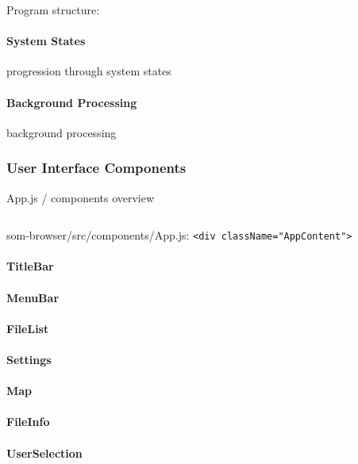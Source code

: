 Program structure:

\paragraph{System States}
\label{para:som-browser_states}
progression through system states

\paragraph{Background Processing}
\label{para:som-browser_background_processing}
background processing

\subsubsection{User Interface Components}
\label{subsubsec:som-browser_components}
App.js / components overview

\begin{listing}[!htb]
  \begin{mdframed}
    \inputminted[numbers=left, firstline=400, lastline=460,
    fontsize=\scriptsize]{jsx}{../dev/som-browser/src/components/App.js}
  \end{mdframed}
  \caption{som-browser/src/components/App.js:
  \texttt{<div className="AppContent">}}
  \label{lst:som-browser_app_content}
\end{listing}

\paragraph{TitleBar}
\label{para:title_bar}

\paragraph{MenuBar}
\label{para:menu_bar}

\paragraph{FileList}
\label{para:file_list}

\paragraph{Settings}
\label{para:settings}

\paragraph{Map}
\label{para:map}

\paragraph{FileInfo}
\label{para:file_info}

\paragraph{UserSelection}
\label{para:user_selection}

